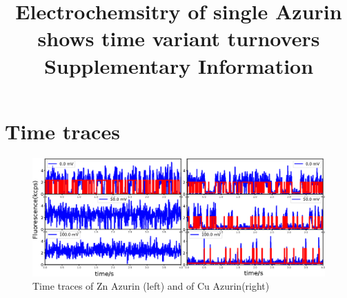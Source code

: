 \documentclass[11pt,a4paper,onecolumn]{article}
\newcommand*{\affaddr}[1]{#1} %
\newcommand*{\email}[1]{\texttt{#1}} %
\begin{document}

\date{\vspace{1ex}} %
\title{\textbf{Electrochemsitry of single Azurin shows time variant turnovers}\\ \vspace{3ex} Supplementary Information \vspace{3ex}}
\maketitle
\tableofcontents
\pagebreak

\section{Time traces}

\begin{figure}
  \centering
  \includegraphics[width=\textwidth,keepaspectratio]{Figure_SI/SI_timetrace_Zn_Cu.eps}
	\makeatletter
	\renewcommand{\fnum@figure}{\figurename~S\thefigure}
	\makeatother
  \caption{Time traces of Zn Azurin (left) and of Cu Azurin(right)}
  \label{fg:NR_coating}
\end{figure}

%
\end{document}
